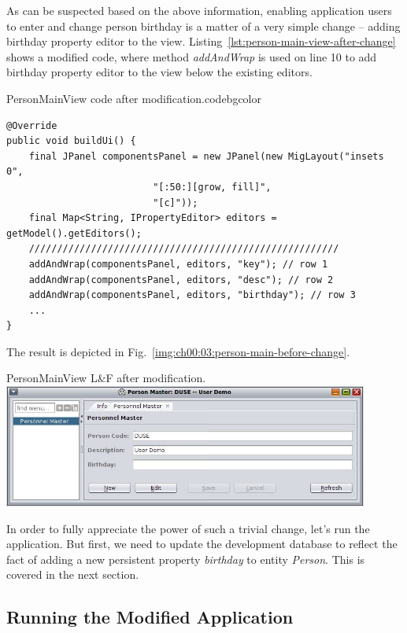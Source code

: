   As can be suspected based on the above information, enabling application users to enter and change person birthday is a matter of a very simple change -- adding birthday property editor to the view.
  Listing~\ref{lst:person-main-view-after-change} shows a modified code, where method \emph{addAndWrap} is used on line 10 to add birthday property editor to the view below the existing editors.

 \begin{code}{PersonMainView code after modification.}{\label{lst:person-main-view-after-change}}{codebgcolor}
    \begin{lstlisting}
@Override
public void buildUi() {
    final JPanel componentsPanel = new JPanel(new MigLayout("insets 0", 
						  "[:50:][grow, fill]", 
						  "[c]"));
    final Map<String, IPropertyEditor> editors = getModel().getEditors();
    ///////////////////////////////////////////////////////    
    addAndWrap(componentsPanel, editors, "key"); // row 1
    addAndWrap(componentsPanel, editors, "desc"); // row 2
    addAndWrap(componentsPanel, editors, "birthday"); // row 3
    ...
}
    \end{lstlisting}
  \end{code}  

  The result is depicted in Fig.~\ref{img:ch00:03:person-main-before-change}.

  \begin{image}{PersonMainView L\&F after modification.}{\label{img:ch00:03:person-main-after-change}}
    \includegraphics[width=0.9\textwidth]{parts/00-part/chapters/02-making-changes/images/06-person-main-after-change.png}
  \end{image}

  In order to fully appreciate the power of such a trivial change, let's run the application.
  But first, we need to update the development database to reflect the fact of adding a new persistent property \emph{birthday} to entity \emph{Person}.
  This is covered in the next section.
  

\subsection{Running the Modified Application}

